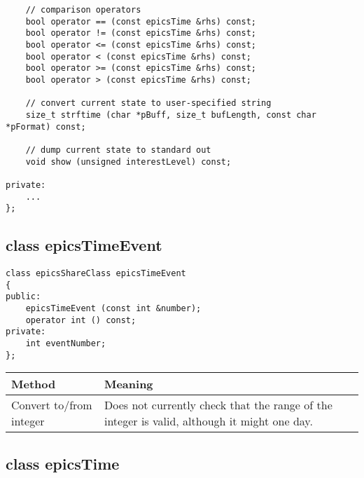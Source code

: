 \begin{verbatim}
    // comparison operators
    bool operator == (const epicsTime &rhs) const;
    bool operator != (const epicsTime &rhs) const;
    bool operator <= (const epicsTime &rhs) const;
    bool operator < (const epicsTime &rhs) const;
    bool operator >= (const epicsTime &rhs) const;
    bool operator > (const epicsTime &rhs) const;

    // convert current state to user-specified string
    size_t strftime (char *pBuff, size_t bufLength, const char *pFormat) const;

    // dump current state to standard out
    void show (unsigned interestLevel) const;

private:
    ...
};
\end{verbatim}
\subsection{class epicsTimeEvent}

\begin{verbatim}class epicsShareClass epicsTimeEvent
{
public:
    epicsTimeEvent (const int &number);
    operator int () const;
private:
    int eventNumber;
};
\end{verbatim}
\begin{center}\begin{longtable}{p{1.79167in}p{4.94833in}}
\textbf{Method} & \textbf{Meaning}\\
\hline
Convert to/from integer & Does not currently check that the range of the integer is valid, although it might one day.
\end{longtable}\end{center}


\subsection{class epicsTime}

